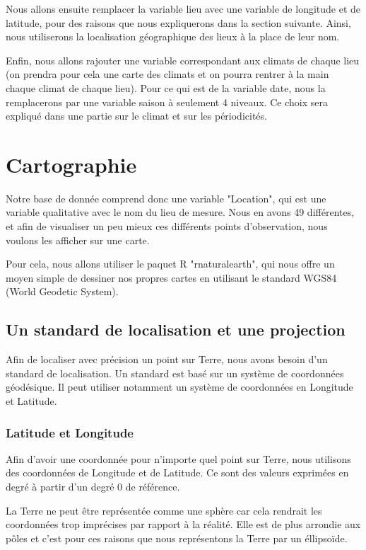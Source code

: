 \documentclass{article}
\begin{document}
Nous allons ensuite remplacer la variable lieu avec une variable de longitude et de latitude, pour des raisons que nous expliquerons dans la section suivante. Ainsi, nous utiliserons la localisation géographique des lieux à la place de leur nom. 

Enfin, nous allons rajouter une variable correspondant aux climats de chaque lieu (on prendra pour cela une carte des climats et on pourra rentrer à la main chaque climat de chaque lieu). Pour ce qui est de la variable date, nous la remplacerons par une variable saison à seulement 4 niveaux. Ce choix sera expliqué dans une partie sur le climat et sur les périodicités. 

\section{Cartographie}

Notre base de donnée comprend donc une variable "Location", qui est une variable qualitative avec le nom du lieu de mesure. Nous en avons 49 différentes, et afin de visualiser un peu mieux ces différents points d'observation, nous voulons les afficher sur une carte. 

Pour cela, nous allons utiliser le paquet R "rnaturalearth", qui nous offre un moyen simple de dessiner nos propres cartes en utilisant le standard WGS84 (World Geodetic System).

\subsection{Un standard de localisation et une projection}

Afin de localiser avec précision un point sur Terre, nous avons besoin d'un standard de localisation. Un standard est basé sur un système de coordonnées géodésique. Il peut utiliser notamment un système de coordonnées en Longitude et Latitude.

\subsubsection{Latitude et Longitude}

Afin d'avoir une coordonnée pour n'importe quel point sur Terre, nous utilisons des coordonnées de Longitude et de Latitude. Ce sont des valeurs exprimées en degré à partir d'un degré 0 de référence.

La Terre ne peut être représentée comme une sphère car cela rendrait les coordonnées trop imprécises par rapport à la réalité. Elle est de plus arrondie aux pôles et c'est pour ces raisons que nous représentons la Terre par un éllipsoïde. 
\end{document}

